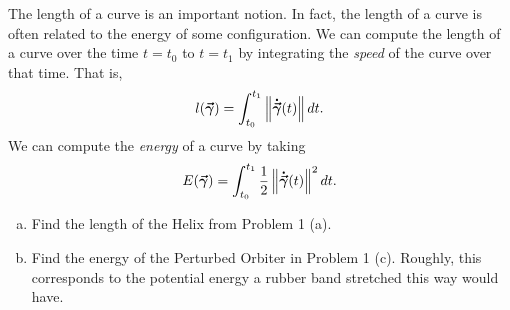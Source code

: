 \documentclass[12pt]{article} %
\begin{document}
\newpage
\begin{problem}
The length of a curve is an important notion. In fact, the length of a curve is often related to the energy of some configuration. We can compute the length of a curve over the time $t=t_0$ to $t=t_1$ by integrating the \emph{speed} of the curve over that time.  That is,
\[
l(\boldsymbol{\vec{\gamma}}) = \int_{t_0}^{t_1} \left\|\boldsymbol{\dot{\vec{\gamma}}}(t)\right\| dt.
\]
We can compute the \emph{energy} of a curve by taking
\[
E(\boldsymbol{\vec{\gamma}}) = \int_{t_0}^{t_1} \frac{1}{2} \left\| \boldsymbol{\dot{\vec{\gamma}}}(t)\right\|^2dt.
\]
\begin{enumerate}[(a)]
	\item Find the length of the Helix from Problem 1 (a).
	\item Find the energy of the Perturbed Orbiter in Problem 1 (c).  Roughly, this corresponds to the potential energy a rubber band stretched this way would have.
\end{enumerate}
\end{problem}
\end{document}
